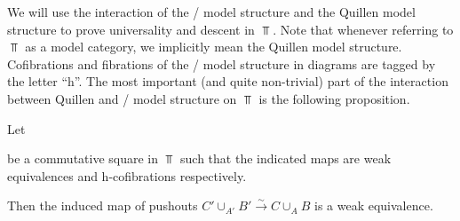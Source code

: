 We will use the interaction of the \Strom/ model structure and the Quillen model structure to prove universality and descent in $\Top$.
Note that whenever referring to $\Top$ as a model category, we implicitly mean the Quillen model structure. 
Cofibrations and fibrations of the \Strom/ model structure in diagrams are tagged by the letter ``h''.
The most important (and quite non-trivial) part of the interaction between Quillen and \Strom/ model structure on $\Top$ is the following proposition.
\begin{prop}\label{prop:poOfWeIsWe}
    Let 
    \begin{center}
    \end{center}
    be a commutative square in $\Top$ such that the indicated maps are weak equivalences and h-cofibrations respectively.

    Then the induced map of pushouts $C'\cup_{A'}B'\xrightarrow{\sim} C\cup_AB$ is a weak equivalence.
    \begin{reference}
        \cite[Proposition 1.1]{hcolim_bar}
    \end{reference}
\end{prop}
